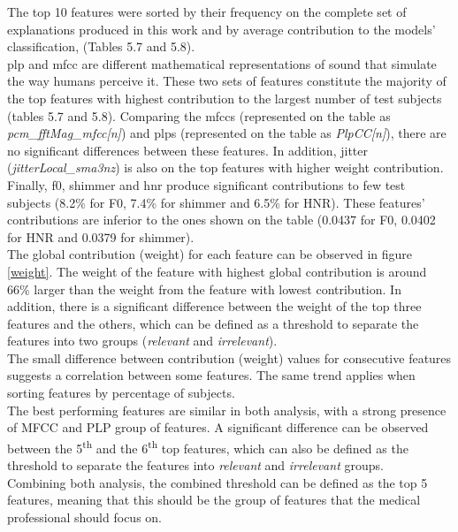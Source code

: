 The top 10 features were sorted by their frequency on the complete set of explanations produced in this work and by average contribution to the models' classification, (Tables 5.7 and 5.8). \\
\gls{plp} and \gls{mfcc} are different mathematical representations of sound that simulate the way humans perceive it. These two sets of features constitute the majority of the top features with highest contribution to the largest number of test subjects (tables 5.7 and 5.8).
Comparing the \gls{mfcc}s (represented on the table as \textit{pcm\_fftMag\_mfcc[n]}) and \gls{plp}s (represented on the table as \textit{PlpCC[n]}), there are no significant differences between these features. In addition, jitter (\textit{jitterLocal\_sma3nz}) is also on the top features with higher weight contribution. Finally, \gls{f0}, shimmer and \gls{hnr} produce significant contributions to few test subjects (8.2\% for F0, 7.4\% for shimmer and 6.5\% for HNR). These features' contributions are inferior to the ones shown on the table (0.0437 for F0, 0.0402 for HNR and 0.0379 for shimmer). \\
The global contribution (weight) for each feature can be observed in figure \ref{weight}. The weight of the feature with highest global contribution is around 66\% larger than the weight from the feature with lowest contribution. In addition, there is a significant difference between the weight of the top three features and the others, which can be defined as a threshold to separate the features into two groups (\textit{relevant} and \textit{irrelevant}). \\
The small difference between contribution (weight) values for consecutive features suggests a correlation between some features. The same trend applies when sorting features by percentage of subjects. \\ 
The best performing features are similar in both analysis, with a strong presence of MFCC and PLP group of features. A significant difference can be observed between the 5\textsuperscript{th} and the 6\textsuperscript{th} top features, which can also be defined as the threshold to separate the features into \textit{relevant} and \textit{irrelevant} groups. \\
Combining both analysis, the combined threshold can be defined as the top 5 features, meaning that this should be the group of features that the medical professional should focus on.

